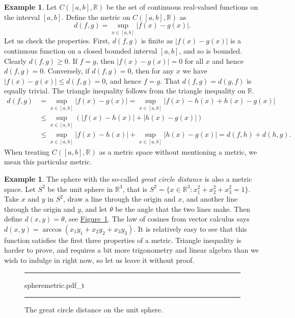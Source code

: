 \documentclass[12pt,openany]{book}
\newcommand{\abs}[1]{\left\lvert {#1} \right\rvert}
\newcommand{\R}{{\mathbb{R}}}
\newcommand{\myindex}[1]{#1\index{#1}}
\theoremstyle{plain}
\theoremstyle{remark}
\theoremstyle{definition}
\newenvironment{myfig}{%
\begin{figure}[h!t]
\noindent\rule{\textwidth}{0.4pt}\vspace{12pt}\par\centering}%
{\par\noindent\rule{\textwidth}{0.4pt}
\end{figure}}
\theoremstyle{exercise}
\theoremstyle{example}
\newtheorem{example}[thm]{Example}
\newcommand{\figureref}[1]{\hyperref[#1]{Figure~\ref*{#1}}}
\begin{document}
\begin{example} \label{example:msC01}
Let $C([a,b],\R)$ be the set of continuous real-valued functions on the
interval $[a,b]$.  Define the metric on $C([a,b],\R)$ as
\begin{equation*}
d(f,g) = \sup_{x \in [a,b]} \abs{f(x)-g(x)} .
\end{equation*}
Let us check the properties.  First, $d(f,g)$ is finite as
$\abs{f(x)-g(x)}$ is a continuous function on a closed bounded interval
$[a,b]$, and so is bounded.
Clearly $d(f,g) \geq 0$. 
If $f = g$,
then $\abs{f(x)-g(x)} = 0$ for all $x$ and hence $d(f,g) = 0$.  Conversely,
if $d(f,g) = 0$, then for any $x$ we have $\abs{f(x)-g(x)} \leq d(f,g) = 0$,
and hence $f=g$.  That $d(f,g) = d(g,f)$
is equally trivial.  The triangle inequality follows from the 
triangle inequality on $\R$.
\begin{equation*}
\begin{split}
d(f,g) & =
\sup_{x \in [a,b]} \abs{f(x)-g(x)} =
\sup_{x \in [a,b]} \abs{f(x)-h(x)+h(x)-g(x)}
\\
& \leq
\sup_{x \in [a,b]} ( \abs{f(x)-h(x)}+\abs{h(x)-g(x)} )
\\
& \leq
\sup_{x \in [a,b]} \abs{f(x)-h(x)}+
\sup_{x \in [a,b]} \abs{h(x)-g(x)} = d(f,h) + d(h,g) .
\end{split}
\end{equation*}
When treating $C([a,b],\R)$ as a metric space without mentioning a metric, we mean this
particular metric.
\end{example}

\begin{example} \label{ms:greatcircle}
The sphere with the so-called
\emph{\myindex{great circle distance}} is also a metric space.
Let $S^2$ be the \myindex{unit sphere} in $\R^3$,
that is $S^2 = \{ x \in \R^3 : x_1^2+x_2^2+x_3^2 = 1 \}$.
Take $x$ and $y$ in $S^2$, draw a line through the origin and $x$,
and another line through the origin and $y$,
and let $\theta$ be the angle that the two lines make.
Then define $d(x,y) = \theta$, see \figureref{fig:spheremetric}.
The law of cosines from vector calculus says
$d(x,y) = \arccos(x_1y_1+x_2y_2+x_3y_3)$.
It is relatively easy to see that this function satisfies the first three
properties of a metric.
Triangle inequality is harder to prove, and requires a bit more
trigonometry and linear algebra than we wish to indulge in right now, so let
us leave it without proof.
\begin{myfig}
{spheremetric.pdf_t}
\caption{The great circle distance on the unit sphere.\label{fig:spheremetric}}
\end{myfig}
\end{example}
\end{document}

